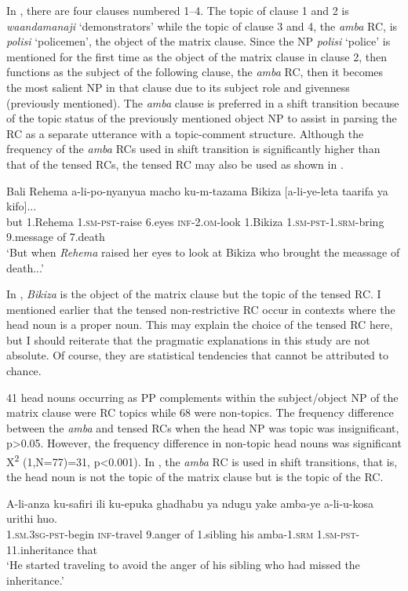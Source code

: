 \documentclass[output=paper,colorlinks,citecolor=brown]{langscibook}
\begin{document}
In , there are four clauses numbered 1--4. The topic of clause 1 and 2 is \textit{waandamanaji} ‘demonstrators’ while the topic of clause 3 and 4, the \textit{amba} RC, is \textit{polisi} ‘policemen’, the object of the matrix clause. Since the NP \textit{polisi} ‘police’ is mentioned for the first time as the object of the matrix clause in clause 2, then functions as the subject of the following clause, the \textit{amba} RC, then it becomes the most salient NP in that clause due to its subject role and givenness (previously mentioned). The \textit{amba} clause is preferred in a shift transition because of the topic status of the previously mentioned object NP to assist in parsing the RC as a separate utterance with a topic-comment structure. Although the frequency of the \textit{amba} RCs used in shift transition is significantly higher than that of the tensed RCs, the tensed RC may also be used as shown in .

\ea%
    \label{ex:mwamzandi:29}
    \gll    Bali Rehema a-li-po-nyanyua macho ku-m-tazama Bikiza [a-li-ye-leta taarifa ya kifo]...\\
            but 1.Rehema \textsc{1.sm-pst-}raise 6.eyes \textsc{inf-2.om-}look 1.Bikiza  \textsc{1.sm-pst-1.srm-}bring 9.message of 7.death\\
    \glt    ‘But when \textit{Rehema} raised her eyes to look at Bikiza who brought the meassage of death...’
\z

In , \textit{Bikiza} is the object of the matrix clause but the topic of the tensed RC. I mentioned earlier that the tensed non-restrictive RC occur in contexts where the head noun is a proper noun. This may explain the choice of the tensed RC here, but I should reiterate that the pragmatic explanations in this study are not absolute. Of course, they are statistical tendencies that cannot be attributed to chance.

41 head nouns occurring as PP complements within the subject/object NP of the matrix clause were RC topics while 68 were non-topics. The frequency difference between the \textit{amba} and tensed RCs when the head NP was topic was insignificant, p>0.05. However, the frequency difference in non-topic head nouns was significant X\textsuperscript{2} (1,N=77)=31, p<0.001). In , the \textit{amba} RC is used in shift transitions, that is, the head noun is not the topic of the matrix clause but is the topic of the RC.

\ea%
    \label{ex:mwamzandi:30}
    \gll    A-li-anza ku-safiri ili ku-epuka ghadhabu ya ndugu yake amba-ye a-li-u-kosa urithi huo.\\
            \textsc{1.sm.3sg-pst-}begin \textsc{inf-}travel 9.anger of 1.sibling his amba\textsc{-1.srm} \textsc{1.sm-pst-}11.inheritance that\\
    \glt    ‘He started traveling to avoid the anger of his sibling who had missed the inheritance.’
\z
\end{document}

